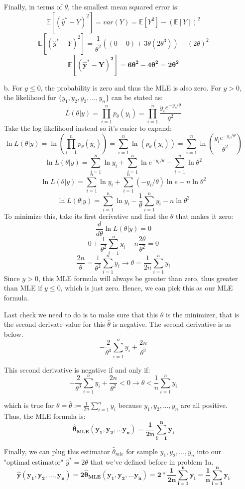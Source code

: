 \documentclass[twoside]{homework}
\begin{document}
\begin{itemize}
    Finally, in terms of $\theta$, the smallest mean squared error is:
    $$\mathbb{E}[(\hat{y}^*-Y)^2]=var(Y)=\mathbb{E}[Y^2]-(\mathbb{E}[Y])^2$$
    $$\mathbb{E}[(\hat{y}^*-Y)^2]=\frac{1}{\theta^2}((0-0)+3\theta(2\theta^3))-(2\theta)^2$$
    $$\boldsymbol{\mathbb{E}[(\hat{y}^*-Y)^2]=6\theta^2-4\theta^2=2\theta^2}$$

    \item [b.] For $y\leq{0}$, the probability is zero and thus the MLE is also zero. For $y>0$, the likelihood for $\{y_1,y_2,y_3,...,y_n\}$ can be stated as:
        $$L(\theta|y)=\prod_{i=1}^{n}p_{\theta}(y_i) = \prod_{i=1}^{n}\frac{y_ie^{-y_i/\theta}}{\theta^2}$$
        Take the log likelihood instead so it's easier to expand:
        $$\ln{}L(\theta|y)=\ln(\prod_{i=1}^{n}p_{\theta}(y_i))=\sum_{i=1}^n\ln(p_{\theta}(y_i)) = \sum_{i=1}^n\ln(\frac{y_ie^{-y_i/\theta}}{\theta^2})$$
        $$\ln{}L(\theta|y)=\sum_{i=1}^n\ln{y_i}+\sum_{i=1}^n\ln{e^{-y_i/\theta}}-\sum_{i=1}^n\ln{\theta^2}$$
        $$\ln{}L(\theta|y)=\sum_{i=1}^n\ln{y_i}+\sum_{i=1}^n(-y_i/\theta)\ln{e}-n\ln{\theta^2}$$
        $$\ln{}L(\theta|y)=\sum_{i=1}^n\ln{y_i}-\frac{1}{\theta}\sum_{i=1}^n{y_i}-n\ln{\theta^2}$$
        To minimize this, take its first derivative and find the $\theta$ that makes it zero:
        $$\frac{d}{d\theta}\ln{}L(\theta|y) = 0$$
        $$0 + \frac{1}{\theta^2}\sum_{i=1}^n{y_i} - n\frac{2\theta}{\theta^2} = 0$$
        $$\frac{2n}{\theta} = \frac{1}{\theta^2}\sum_{i=1}^n{y_i} \xrightarrow{} \theta = \frac{1}{2n}\sum_{i=1}^n{y_i}$$
        Since $y>0$, this MLE formula will always be greater than zero, thus greater than MLE if $y\leq{0}$, which is just zero. Hence, we can pick this as our MLE formula.

        Last check we need to do is to make sure that this $\hat{\theta}$ is the minimizer, that is the second derivate value for this $\hat{\theta}$ is negative. The second derivative is as below.
        $$-\frac{2}{\theta^3}\sum_{i=1}^n{y_i}+\frac{2n}{\theta^2}$$

        This second derivative is negative if and only if:
        $$-\frac{2}{\theta^3}\sum_{i=1}^n{y_i}+\frac{2n}{\theta^2}<0 \xrightarrow{} \theta<\frac{1}{n}\sum_{i=1}^n{y_i}$$

        which is true for $\theta=\hat{\theta}:=\frac{1}{2n}\sum_{i=1}^n{y_i}$ because $y_1,y_2,...,y_n$ are all positive. Thus, the MLE formula is: $$\boldsymbol{\hat{\theta}_{MLE}(y_1, y_2, ... y_n)=\frac{1}{2n}\sum_{i=1}^n{y_i}}$$

        Finally, we can plug this estimator $\hat{\theta}_{mle}$ for sample ${y_1, y_2, ..., y_n}$ into our "optimal estimator" $\hat{y}^*=2\theta$ that we've defined before in problem 1a.
        $$\boldsymbol{\hat{y}(y_1, y_2, ..., y_n)=2\hat{\theta}_{MLE}(y_1, y_2, ... y_n)=2*\frac{1}{2n}\sum_{i=1}^n{y_i}=\frac{1}{n}\sum_{i=1}^n{y_i}}$$


\end{itemize}
\end{document}
